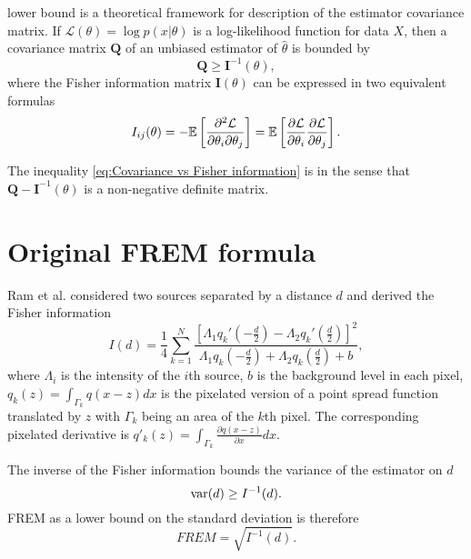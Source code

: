 \CR lower bound is a theoretical framework for description of the estimator covariance matrix. If $\mathcal{L}(\theta)=\log p(x|\theta)$ is a log-likelihood function for data $X$, then a covariance matrix $\bm{Q}$ of an unbiased estimator of $\hat{\theta}$ is bounded by \cite{Rao1945,Cover1991} 
%
\begin{equation}
	\bm{Q}\geq\bm{I}^{-1}(\theta),
	\label{eq:Covariance vs Fisher information}
\end{equation}
%
where the Fisher information matrix $\bm{I}(\theta)$ can be expressed in two equivalent formulas
%
\begin{equation}
	I_{ij}(\theta)=-\mathbb{E}\left[\frac{\partial^2\mathcal{L}}{\partial\theta_i\partial\theta_j}\right]=\mathbb{E}\left[\frac{\partial\mathcal{L}}{\partial\theta_i}\frac{\partial\mathcal{L}}{\partial\theta_j}\right].
	\label{eq:Fisher information general}
\end{equation}

The inequality \autoref{eq:Covariance vs Fisher information} is in the sense that $\bm{Q}-\bm{I}^{-1}(\theta)$ is a non-negative definite matrix.

\section{Original FREM formula\label{sec:FREM orig}}

Ram et al. \cite{Ram2006} considered two sources separated by a distance $d$ and derived the Fisher information
%
\begin{equation}
	I(d)=\frac{1}{4}\sum_{k=1}^N\frac{\left[\Lambda_1q_k'(-\frac{d}{2})-\Lambda_2q_k'(\frac{d}{2})\right]^2}{\Lambda_1q_k(-\frac{d}{2})+\Lambda_2q_k(\frac{d}{2})+b},
	\label{eq:Ram FREM}
\end{equation}
%
where $\Lambda_i$ is the intensity of the $i$th source, $b$ is the background level in each pixel, $q_k(z)=\int_{\Gamma_k}q(x-z)dx$ is the pixelated version of a point spread function translated by $z$ with $\Gamma_k$ being an area of the $k$th pixel. The corresponding pixelated derivative is $q'_k(z)=\int_{\Gamma_k}\frac{\partial q(x-z)}{\partial x}dx$. 

The inverse of the Fisher information bounds the variance of the estimator on $d$ 
%
\begin{equation}
	\mathrm{var}(d)\geq I^{-1}(d).
\end{equation}
%
FREM as a lower bound on the standard deviation is therefore
%
\begin{equation}
	\unit{FREM}=\sqrt{I^{-1}(d)}.
	\label{eq:FREM}	
\end{equation}

